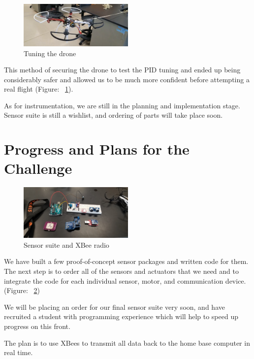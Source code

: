 \begin{figure}[!htbp]
\centering 
        \includegraphics[width=0.5\textwidth]{figs/tune.png}
\caption[Tuning the drone]{Tuning the drone}
\label{fig:tuning} 
\end{figure}

This method of securing the drone to test the PID tuning and ended up being considerably safer and allowed us to be much more confident before attempting a real flight (Figure: ~\ref{fig:tuning}).

As for instrumentation, we are still in the planning and implementation stage. Sensor suite is still a wishlist, and ordering of parts will take place soon.

\section{Progress and Plans for the Challenge}

\begin{figure}[!htbp]
\centering 
        \includegraphics[width=0.5\textwidth]{figs/electronics.jpg}
\caption[Sensor suite and XBee radio]{Sensor suite and XBee radio}
\label{fig:electronics} 
\end{figure}

We have built a few proof-of-concept sensor packages and written code for them. The next step is to order all of the sensors and actuators that we need and to integrate the code for each individual sensor, motor, and communication device. (Figure: ~\ref{fig:electronics})

We will be placing an order for our final sensor suite very soon, and have recruited a student with programming experience which will help to speed up progress on this front.

The plan is to use XBees to transmit all data back to the home base computer in real time.

